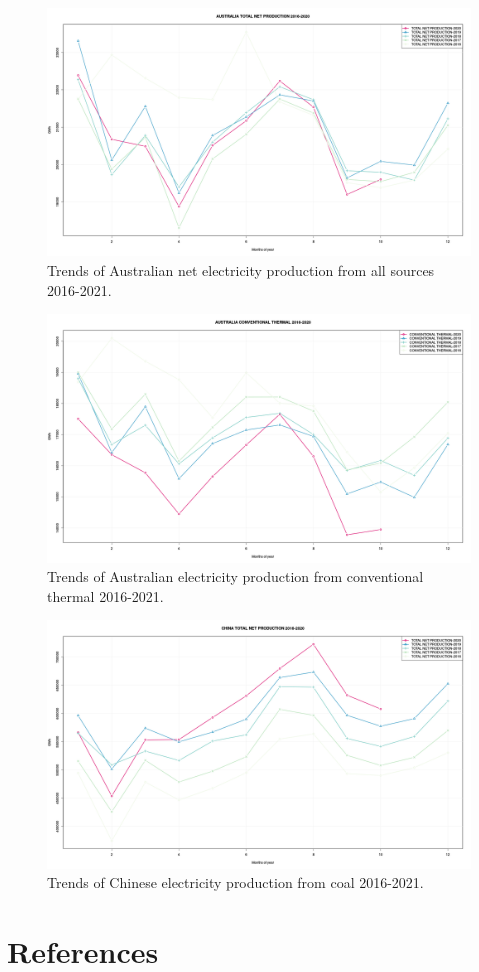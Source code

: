 \documentclass[final,3p,times,authoryear]{elsarticle}
\begin{document}
\begin{figure}
\centering
\includegraphics[width=.99\linewidth]{images/AUSTRALIATOTALNETPRODUCTION.png}
\caption{Trends of Australian net electricity production from all sources 2016-2021.}
 \label{fig:au-total}
\end{figure}

\begin{figure}
\centering
\includegraphics[width=.99\linewidth]{images/AUSTRALIACONVENTIONALTHERMAL.png}
\caption{Trends of Australian electricity production from conventional thermal 2016-2021.}
 \label{fig:au-thermal}
\end{figure}

\begin{figure}
\centering
\includegraphics[width=.99\linewidth]{images/CHINATOTALNETPRODUCTION.png}
\caption{Trends of Chinese electricity production from coal 2016-2021.}
 \label{fig:china-net}
\end{figure}


\section*{References}\label{sec:ref}

   
   
\end{document}
